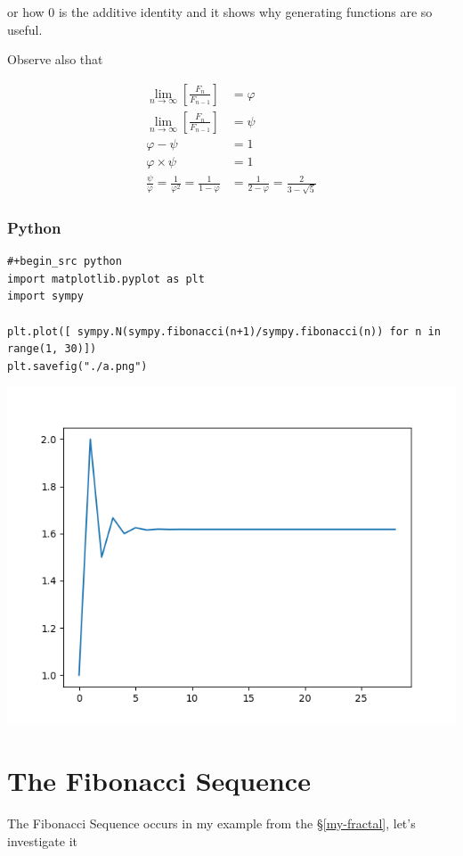 \documentclass[a4paper,11pt,twoside]{article}
\begin{document}
or how 0 is the additive identity and it shows why generating functions
are so useful.

Observe also that

$$\begin{aligned}
\lim_{n     \rightarrow \infty }\left[ \frac{F_n}{F_{n- 1} }  \right] &= \varphi \\
\lim_{n     \rightarrow \infty }\left[ \frac{F_n}{F_{n- 1} }  \right] &= \psi \\
\varphi - \psi &=  1 \\
\varphi \times  \psi  &= 1 \\
\frac{\psi}{\varphi}  = \frac{1}{\varphi^2} = \frac{1}{1-\varphi} &= \frac{1}{2-\varphi} = \frac{2}{3 - \sqrt{5}  }
\end{aligned}$$
\subsubsection{Python}
\label{sec:org4d54b8f}

\begin{verbatim}
#+begin_src python
import matplotlib.pyplot as plt
import sympy

plt.plot([ sympy.N(sympy.fibonacci(n+1)/sympy.fibonacci(n)) for n in range(1, 30)])
plt.savefig("./a.png")
\end{verbatim}
\begin{center}
\includegraphics[width=.9\linewidth]{./a.png}
\end{center}

\section{The Fibonacci Sequence}
\label{sec:org945ff23}
The Fibonacci Sequence occurs in my example from the \S \ref{my-fractal}, let's investigate it
\end{document}
